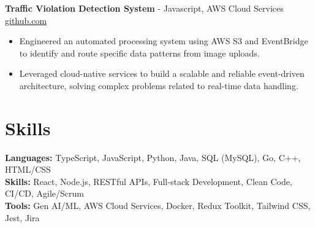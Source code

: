 \documentclass[11pt]{article}       %
\begin{document}
\textbf{Traffic Violation Detection System}{ - Javascript, AWS Cloud Services} \hfill \href{https://github.com/Monica20030707/AWS_rekonigition-N-read-database}{github.com} \\
\vspace{-9pt}
\begin{itemize}
  \item Engineered an automated processing system using AWS S3 and EventBridge to identify and route specific data patterns from image uploads.
  \item Leveraged cloud-native services to build a scalable and reliable event-driven architecture, solving complex problems related to real-time data handling.
\end{itemize}

\vspace{-18.5pt}


\section*{Skills}
\textbf{Languages:} TypeScript, JavaScript, Python, Java, SQL (MySQL), Go, C++, HTML/CSS\\
\textbf{Skills:} React, Node.js, RESTful APIs, Full-stack Development, Clean Code, CI/CD, Agile/Scrum\\
\textbf{Tools:} Gen AI/ML, AWS Cloud Services, Docker, Redux Toolkit, Tailwind CSS, Jest, Jira\\

\vspace{-6.5pt}
\end{document}
